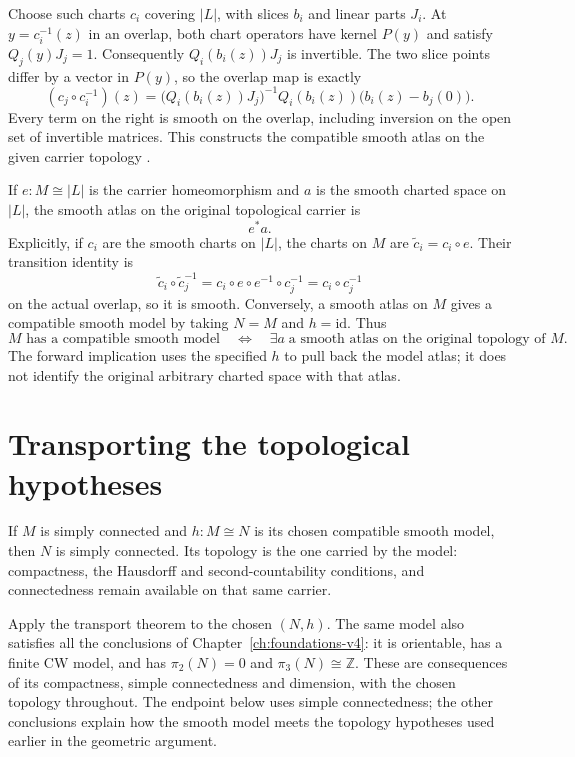 Choose such charts $c_i$ covering $|L|$, with slices $b_i$ and linear
parts $J_i$. At $y=c_i^{-1}(z)$ in an overlap, both chart operators
have kernel $P(y)$ and satisfy $Q_j(y)J_j=1$. Consequently
$Q_i(b_i(z))J_j$ is invertible. The two slice points differ by a
vector in $P(y)$, so the overlap map is exactly
\[
 (c_j\circ c_i^{-1})(z)
 =\bigl(Q_i(b_i(z))J_j\bigr)^{-1}
   Q_i(b_i(z))\bigl(b_i(z)-b_j(0)\bigr).
\]
Every term on the right is smooth on the overlap, including inversion
on the open set of invertible matrices. This constructs the compatible
smooth atlas on the given carrier topology
\cite[Section 9, p.~806]{Cairns1940}.

If $e:M\cong|L|$ is the carrier homeomorphism and $a$ is the smooth
charted space on $|L|$, the smooth atlas on the original topological carrier
is
\[
e^*a.
\]
Explicitly, if $c_i$ are the smooth charts on $|L|$, the charts on $M$
are $\widetilde c_i=c_i\circ e$. Their transition identity is
\[
 \widetilde c_i\circ\widetilde c_j^{-1}
 =c_i\circ e\circ e^{-1}\circ c_j^{-1}=c_i\circ c_j^{-1}
\]
on the actual overlap, so it is smooth. Conversely, a smooth atlas on $M$
gives a compatible smooth model by taking $N=M$ and $h=\mathrm{id}$.
Thus
\[
 M\text{ has a compatible smooth model}\quad\Longleftrightarrow\quad
 \exists a\;\text{a smooth atlas on the original topology of }M.
\]
The forward implication uses the specified $h$ to pull back the model atlas;
it does not identify the original arbitrary charted space with that atlas.

\section{Transporting the topological hypotheses}
\label{sec:m77-m80}

\begin{theorem}
\label{thm:smoothing-hypothesis-transport}
If $M$ is simply connected and $h:M\cong N$ is its chosen compatible
smooth model, then $N$ is simply connected. Its topology is the one
carried by the model: compactness, the Hausdorff and second-countability
conditions, and connectedness remain available on that same carrier.
\end{theorem}

Apply the transport theorem to the chosen $(N,h)$. The same model
also satisfies all the conclusions of
Chapter~\ref{ch:foundations-v4}: it is orientable, has a finite CW model,
and has $\pi_2(N)=0$ and $\pi_3(N)\cong\mathbb Z$. These are consequences
of its compactness, simple connectedness and dimension, with the
chosen topology throughout. The endpoint below uses simple connectedness;
the other conclusions explain how the smooth model meets the topology
hypotheses used earlier in the geometric argument.

